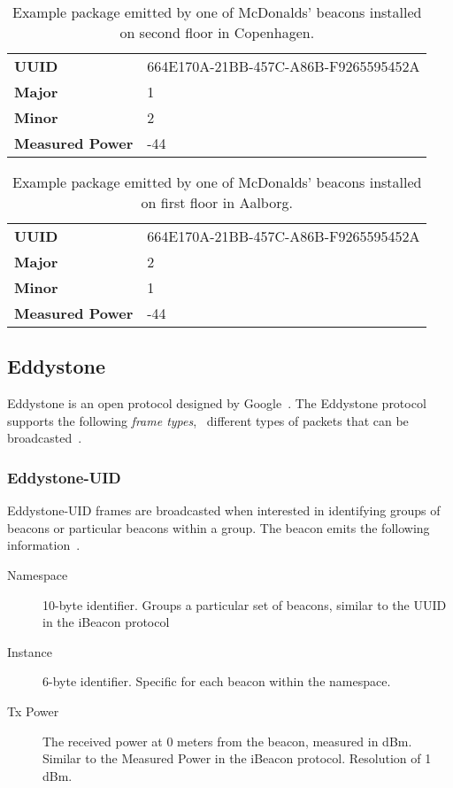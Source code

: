 \begin{table}[h!]
\centering
\caption{Example package emitted by one of McDonalds' beacons installed on second floor in Copenhagen.}
\label{tbl:design:ble-positioning:ibeacon2}
\begin{tabular}{ll}
\textbf{UUID}  & 664E170A-21BB-457C-A86B-F9265595452A \\
\textbf{Major} & 1                                    \\
\textbf{Minor} & 2           \\
\textbf{Measured Power} & -44
\end{tabular}
\end{table}

\begin{table}[h!]
\centering
\caption{Example package emitted by one of McDonalds' beacons installed on first floor in Aalborg.}
\label{tbl:design:ble-positioning:ibeacon3}
\begin{tabular}{ll}
\textbf{UUID}  & 664E170A-21BB-457C-A86B-F9265595452A \\
\textbf{Major} & 2                                    \\
\textbf{Minor} & 1            \\
\textbf{Measured Power} & -44
\end{tabular}
\end{table}

\subsection{Eddystone}

Eddystone is an open protocol designed by Google~\cite{estimote:what-is-eddystone}. The Eddystone protocol supports the following \emph{frame types}, \ie~different types of packets that can be broadcasted~\cite{eddystone:protocol-spec}.

\subsubsection{Eddystone-UID}

Eddystone-UID frames are broadcasted when interested in identifying groups of beacons or particular beacons within a group. The beacon emits the following information~\cite{eddystone:protocol-uid-spec}.

\begin{description}
\item[Namespace] 10-byte identifier. Groups a particular set of beacons, similar to the UUID in the iBeacon protocol
\item[Instance] 6-byte identifier. Specific for each beacon within the namespace.
\item[Tx Power] The received power at 0 meters from the beacon, measured in dBm. Similar to the Measured Power in the iBeacon protocol. Resolution of 1 dBm.
\end{description}

